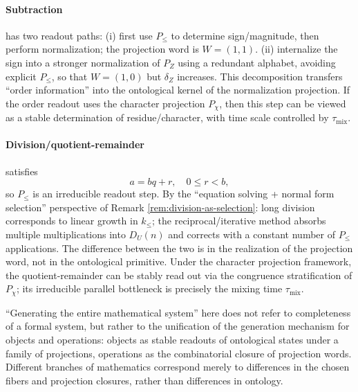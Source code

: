 \paragraph{Subtraction} has two readout paths:
(i) first use $P_{\le}$ to determine sign/magnitude, then perform normalization; the projection word is $W=(1,1)$.
(ii) internalize the sign into a stronger normalization of $P_Z$ using a redundant alphabet, avoiding explicit $P_{\le}$, so that $W=(1,0)$ but $\delta_Z$ increases. This decomposition transfers ``order information'' into the ontological kernel of the normalization projection.
If the order readout uses the character projection $P_\chi$, then this step can be viewed as a stable determination of residue/character, with time scale controlled by $\tau_{\mathrm{mix}}$.

\paragraph{Division/quotient-remainder} satisfies
\[
a=bq+r,\quad 0\le r<b,
\]
so $P_{\le}$ is an irreducible readout step. By the ``equation solving + normal form selection'' perspective of Remark \ref{rem:division-as-selection}: long division corresponds to linear growth in $k_{\le}$; the reciprocal/iterative method absorbs multiple multiplications into $D_U(n)$ and corrects with a constant number of $P_{\le}$ applications. The difference between the two is in the realization of the projection word, not in the ontological primitive.
Under the character projection framework, the quotient-remainder can be stably read out via the congruence stratification of $P_\chi$; its irreducible parallel bottleneck is precisely the mixing time $\tau_{\mathrm{mix}}$.

\begin{remark}\label{rem:pom-math-world}
``Generating the entire mathematical system'' here does not refer to completeness of a formal system, but rather to the unification of the generation mechanism for objects and operations: objects as stable readouts of ontological states under a family of projections, operations as the combinatorial closure of projection words. Different branches of mathematics correspond merely to differences in the chosen fibers and projection closures, rather than differences in ontology.
\end{remark}

